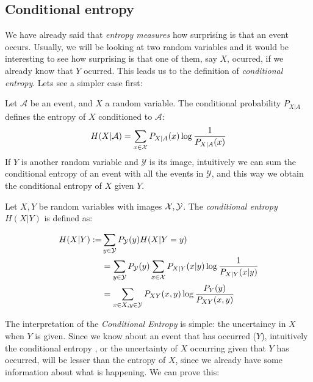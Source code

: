 \subsection*{Conditional entropy}
We have already said that \emph{entropy measures} how surprising is that an event occurs. Usually, we will be looking at two random variables and it would be interesting to see how surprising is that one of them, say $X$, ocurred, if we already know that $Y$ ocurred. This leads us to the definition of \emph{conditional entropy}. Lets see a simpler case first:

Let $\mathcal A$ be an event, and $X$ a random variable. The conditional probability $P_{X|A}$ defines the entropy of $X$ conditioned to $\mathcal A$:
$$
H(X|\mathcal A) = \sum_{x \in \mathcal{X}} P_{X|A}(x) \log\frac{1}{P_{X|A}(x)}
$$
If $Y$ is another random variable and $\mathcal Y$ is its image, intuitively we can sum the conditional entropy of an event with all the events in $\mathcal Y$, and this way we obtain the conditional entropy of $X$ given $Y$.
\begin{ndef}
Let $X,Y$ be random variables with images $\mathcal{X},\mathcal Y$. The \emph{conditional entropy} $H(X | Y)$ is defined as:

\begin{equation*}
        \begin{split}
    H(X|Y) :=  & \sum_{y \in \mathcal Y} P_{\mathcal Y}(y) H(X| Y = y)  \\ 
    & = \sum_{y \in \mathcal Y} P_{\mathcal  Y}(y) \sum_{x \in \mathcal{X}} P_{X | Y}(x|y)\log\frac{1}{P_{X|Y}(x|y)}  \\
   & = \sum_{x \in X,y \in \mathcal Y}P_{XY}(x,y)\log\frac{P_Y(y)}{P_{XY}(x,y)}
\end{split}
\end{equation*}



\end{ndef}

The interpretation of the \emph{Conditional Entropy} is simple: the uncertaincy in $X$ when $Y$ is given. Since we know about an event that has occurred ($Y$), intuitively the conditional entropy , or the uncertainty of $X$ occurring given that $Y$ has occurred, will be lesser than the entropy of $X$, since we already have some information about what is happening. We can prove this:

